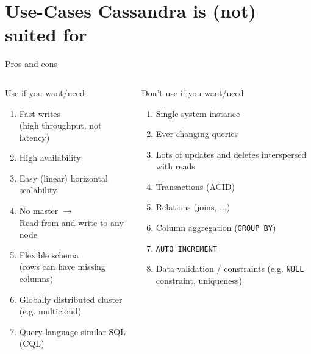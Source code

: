 \documentclass[
  10pt
]{beamer}
\begin{document}
\section{Use-Cases Cassandra is (not) suited for}  %
\begin{frame}{Pros and cons}
  \begin{columns}[T]
    \onslide<+->
    \begin{column}{0.55\textwidth}
      \underline{Use if you want/need}

      \begin{enumerate}[\textbf{\textcolor{aswe-data}{+}}]
        \item<+-> Fast writes \\ (high throughput, not latency)
        \item<+-> High availability
        \item<+-> Easy (linear) horizontal scalability
        \item<+-> No master $\rightarrow$ \\ Read from and write to any node
        \item<+-> Flexible schema \\ (rows can have missing columns)
        \item<+-> Globally distributed cluster (e.g. multicloud)
        \item<+-> Query language similar SQL (CQL)
      \end{enumerate}
    \end{column}

    \onslide<+->
    \begin{column}{0.45\textwidth}
      \underline{Don't use if you want/need}

      \begin{enumerate}[\textbf{\textcolor{aswe-preferences}{-}}]
        \item<+-> Single system instance
        \item<+-> Ever changing queries
        \item<+-> Lots of updates and deletes interspersed with reads
        \item<+-> Transactions (ACID)
        \item<+-> Relations (joins, ...)
        \item<+-> Column aggregation (\lstinline{GROUP BY})
        \item<+-> \lstinline{AUTO INCREMENT}
        \item<+-> Data validation / constraints (e.g. \lstinline{NULL} constraint, uniqueness)
      \end{enumerate}
    \end{column}
  \end{columns}
\end{frame}
\end{document}
